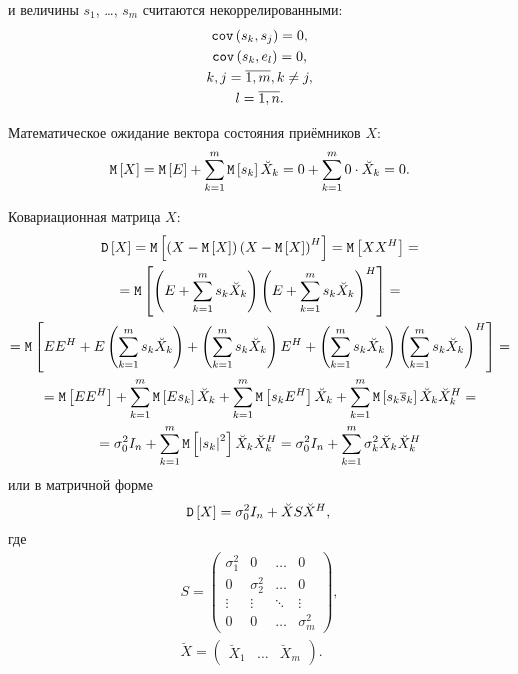 и величины $s_1$, \dots, $s_m$ считаются некоррелированными:
\begin{gather*}
    \mathtt{cov} \left ( s_k, s_j \right ) = 0 , \\
    \mathtt{cov} \left ( s_k, e_l \right ) = 0 , \\
    k,j = \overline{1,m}, k \neq j, \\
    l = \overline{1, n} .
\end{gather*}

Математическое ожидание вектора состояния приёмников $X$:
\[
    \mathtt{M} \left [ X \right ]
    = \mathtt{M} \left [ E \right ] + \sum_{k=1}^m \mathtt{M} \left [ s_k \right ] \breve{X}_k
    = 0 + \sum_{k=1}^m 0 \cdot \breve{X}_k
    = 0.
\]

Ковариационная матрица $X$:
\begin{multline*}
    \mathtt{D} \left [ X \right ]
    = \mathtt{M} \left [ \left ( X - \mathtt{M} \left [ X \right ] \right ) \left ( X - \mathtt{M} \left [ X \right ] \right )^H \right ]
    = \mathtt{M} \left [ X X^H \right ] = \\
    = \mathtt{M} \left [ \left ( E + \sum_{k=1}^m s_k \breve{X}_k \right ) \left ( E + \sum_{k=1}^m s_k \breve{X}_k \right )^H \right ] = \\
    = \mathtt{M} \left [ E E^H + E \left ( \sum_{k=1}^m s_k \breve{X}_k \right ) + \left ( \sum_{k=1}^m s_k \breve{X}_k \right ) E^H + \left ( \sum_{k=1}^m s_k \breve{X}_k \right ) \left ( \sum_{k=1}^m s_k \breve{X}_k \right )^H \right ] = \\
    = \mathtt{M} \left [ E E^H \right ] + \sum_{k=1}^m \mathtt{M} \left [ E s_k \right ] \breve{X}_k + \sum_{k=1}^m \mathtt{M} \left [ s_k E^H \right ] \breve{X}_k + \sum_{k=1}^m \mathtt{M} \left [ s_k \overline{s}_k \right ] \breve{X}_k \breve{X}_k^H = \\
    = \sigma_0^2 I_n + \sum_{k=1}^m \mathtt{M} \left [ \left | s_k \right |^2 \right ] \breve{X}_k \breve{X}_k^H
    = \sigma_0^2 I_n + \sum_{k=1}^m \sigma_k^2 \breve{X}_k \breve{X}_k^H
\end{multline*}
или в матричной форме
\[
    \mathtt{D} \left [ X \right ] = \sigma_0^2 I_n + \breve{X} S \breve{X}^H , \\
\]
где
\begin{gather*}
    S =
    \begin{pmatrix}
        \sigma_1^2 & 0          & \dots  & 0          \\
        0          & \sigma_2^2 & \dots  & 0          \\
        \vdots     & \vdots     & \ddots & \vdots     \\
        0          & 0          & \dots  & \sigma_m^2
    \end{pmatrix}, \\
    \breve{X} =
    \begin{pmatrix}
        \breve{X}_1 & \dots & \breve{X}_m
    \end{pmatrix} .
\end{gather*}

